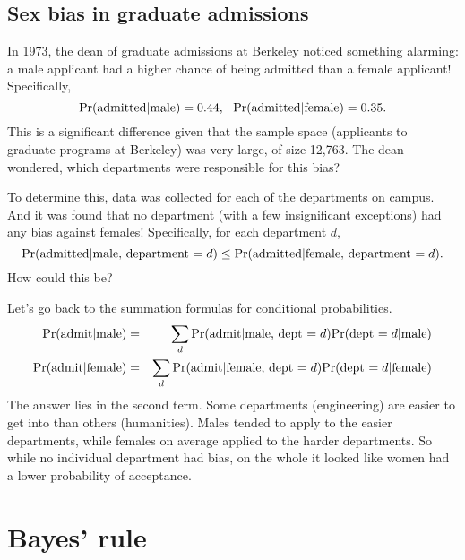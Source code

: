 \subsection{Sex bias in graduate admissions}

In 1973, the dean of graduate admissions at Berkeley noticed something alarming: a male applicant had a higher chance of being admitted than a female applicant! Specifically, 
$$ \mbox{\rm Pr}(\mbox{admitted} | \mbox{male}) = 0.44, 
\ \  \mbox{\rm Pr}(\mbox{admitted} | \mbox{female}) = 0.35.$$
This is a significant difference given that the sample space (applicants to graduate programs at Berkeley) was very large, of size 12{,}763. The dean wondered, which departments were responsible for this bias?

To determine this, data was collected for each of the departments on campus. And it was found that no department (with a few insignificant exceptions) had any bias against females! Specifically, for each department $d$,
$$ \mbox{\rm Pr}(\mbox{admitted} | \mbox{male, department $=d$}) 
\leq \mbox{\rm Pr}(\mbox{admitted} | \mbox{female, department $=d$}).$$
How could this be?

Let's go back to the summation formulas for conditional probabilities.
\begin{eqnarray*}
\mbox{\rm Pr}(\mbox{admit} | \mbox{male}) 
& = & 
\sum_d \mbox{\rm Pr}(\mbox{admit} | \mbox{male, dept $= d$}) \mbox{\rm Pr}(\mbox{dept $=d$} | \mbox{male}) \\
\mbox{\rm Pr}(\mbox{admit} | \mbox{female}) 
& = & 
\sum_d \mbox{\rm Pr}(\mbox{admit} | \mbox{female, dept $= d$}) \mbox{\rm Pr}(\mbox{dept $=d$} | \mbox{female}) 
\end{eqnarray*}
The answer lies in the second term. Some departments (engineering) are easier to get into than others (humanities). Males tended to apply to the easier departments, while females on average applied to the harder departments. So while no individual department had bias, on the whole it looked like women had a lower probability of acceptance.

\section{Bayes' rule}


